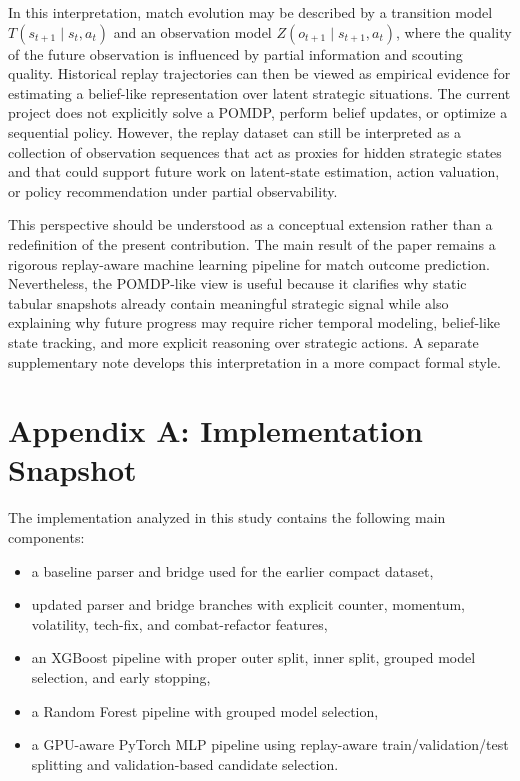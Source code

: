 \documentclass[11pt,a4paper]{article}
\begin{document}
In this interpretation, match evolution may be described by a transition model $T(s_{t+1}\mid s_t, a_t)$ and an observation model $Z(o_{t+1}\mid s_{t+1}, a_t)$, where the quality of the future observation is influenced by partial information and scouting quality. Historical replay trajectories can then be viewed as empirical evidence for estimating a belief-like representation over latent strategic situations. The current project does not explicitly solve a POMDP, perform belief updates, or optimize a sequential policy. However, the replay dataset can still be interpreted as a collection of observation sequences that act as proxies for hidden strategic states and that could support future work on latent-state estimation, action valuation, or policy recommendation under partial observability.

This perspective should be understood as a conceptual extension rather than a redefinition of the present contribution. The main result of the paper remains a rigorous replay-aware machine learning pipeline for match outcome prediction. Nevertheless, the POMDP-like view is useful because it clarifies why static tabular snapshots already contain meaningful strategic signal while also explaining why future progress may require richer temporal modeling, belief-like state tracking, and more explicit reasoning over strategic actions. A separate supplementary note develops this interpretation in a more compact formal style.

\appendix
\section{Appendix A: Implementation Snapshot}
The implementation analyzed in this study contains the following main components:
\begin{itemize}
    \item a baseline parser and bridge used for the earlier compact dataset,
    \item updated parser and bridge branches with explicit counter, momentum, volatility, tech-fix, and combat-refactor features,
    \item an XGBoost pipeline with proper outer split, inner split, grouped model selection, and early stopping,
    \item a Random Forest pipeline with grouped model selection,
    \item a GPU-aware PyTorch MLP pipeline using replay-aware train/validation/test splitting and validation-based candidate selection.
\end{itemize}
\end{document}

